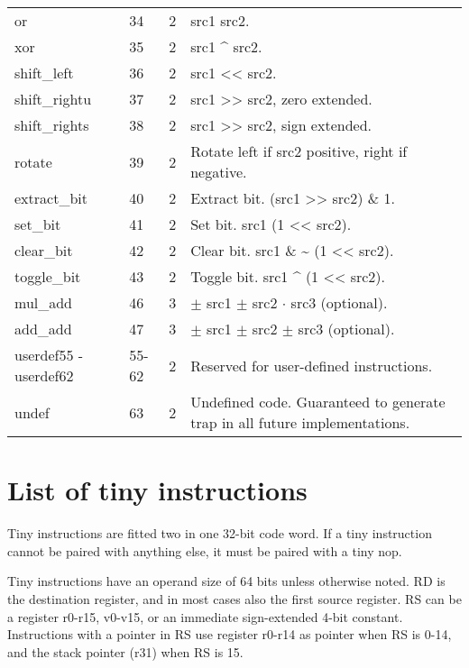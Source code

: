 \documentclass[forwardcom.tex]{subfiles}
\begin{document}
\begin{longtable} {|p{18mm}|p{9mm}|p{9mm}|p{76mm}|}
or           & 34 & 2 & src1 \textbar{} src2. \\
xor          & 35 & 2 & src1 \^{} src2. \\
shift\_left  & 36 & 2 & src1 \textless\textless{} src2.  \\
shift\_rightu& 37 & 2 & src1 \textgreater\textgreater{} src2, zero extended. \\
shift\_rights& 38 & 2 & src1 \textgreater\textgreater{} src2, sign extended. \\
rotate       & 39 & 2 & Rotate left if src2 positive, right if negative. \\
extract\_bit & 40 & 2 & Extract bit. (src1 \textgreater\textgreater{} src2) \& 1. \\
set\_bit     & 41 & 2 & Set bit. src1 \textbar{} (1 \textless\textless{} src2). \\
clear\_bit   & 42 & 2 & Clear bit. src1 \& \~{} (1 \textless\textless{} src2). \\
toggle\_bit  & 43 & 2 & Toggle bit. src1 \^{} (1 \textless\textless{} src2). \\
mul\_add     & 46 & 3 & $\pm$ src1 $\pm$ src2 $\cdot$ src3 (optional). \\
add\_add     & 47 & 3 & $\pm$ src1 $\pm$ src2 $\pm$ src3 (optional). \\
userdef55 - userdef62
             & 55-62 & 2 & Reserved for user-defined instructions. \\
undef        & 63 & 2 & Undefined code. Guaranteed to generate trap in all future implementations. \\
\hline
\end{longtable}


\section{List of tiny instructions}
Tiny instructions are fitted two in one 32-bit code word. If a tiny instruction cannot be paired with anything else, it must be paired with a tiny nop.
\vspace{2mm}

Tiny instructions have an operand size of 64 bits unless otherwise noted. RD is the destination register, and in most cases also the first source register. RS can be a register r0-r15, v0-v15, or an immediate sign-extended 4-bit constant. Instructions with a pointer in RS use register r0-r14 as pointer when RS is 0-14, and the stack pointer (r31) when RS is 15.
\vspace{2mm}
\end{document}
